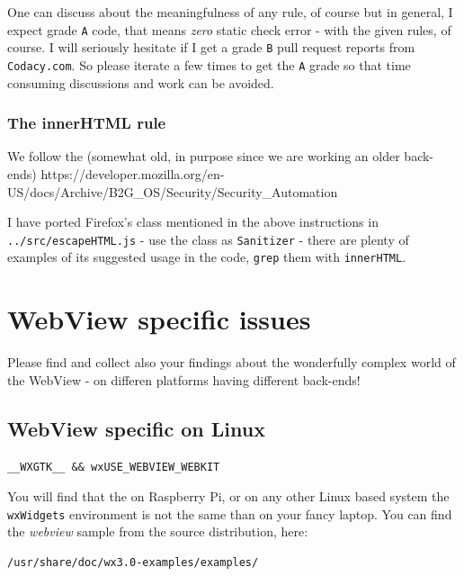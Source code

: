 \documentclass[11pt]{article}
\begin{document}
    One can discuss about the meaningfulness of any rule, of course but in
general, I expect grade \texttt{A} code, that means \emph{zero} static
check error - with the given rules, of course. I will seriously hesitate
if I get a grade \texttt{B} pull request reports from
\texttt{Codacy.com}. So please iterate a few times to get the \texttt{A}
grade so that time consuming discussions and work can be avoided.

    \hypertarget{the-innerhtml-rule}{%
\subsubsection{The innerHTML rule}\label{the-innerhtml-rule}}

    We follow the (somewhat old, in purpose since we are working an older
back-ends)
https://developer.mozilla.org/en-US/docs/Archive/B2G\_OS/Security/Security\_Automation

    I have ported Firefox's class mentioned in the above instructions in
\texttt{../src/escapeHTML.js} - use the class as \texttt{Sanitizer} -
there are plenty of examples of its suggested usage in the code,
\texttt{grep} them with \texttt{innerHTML}.

    \hypertarget{webview-specific-issues}{%
\section{WebView specific issues}\label{webview-specific-issues}}

    Please find and collect also your findings about the wonderfully complex
world of the WebView - on differen platforms having different back-ends!

    \hypertarget{webview-specific-on-linux}{%
\subsection{WebView specific on Linux}\label{webview-specific-on-linux}}

    \begin{verbatim}
__WXGTK__ && wxUSE_WEBVIEW_WEBKIT
\end{verbatim}

    You will find that the on Raspberry Pi, or on any other Linux based
system the \texttt{wxWidgets} environment is not the same than on your
fancy laptop. You can find the \emph{webview} sample from the source
distribution, here:

\begin{verbatim}
/usr/share/doc/wx3.0-examples/examples/
\end{verbatim}
\end{document}
